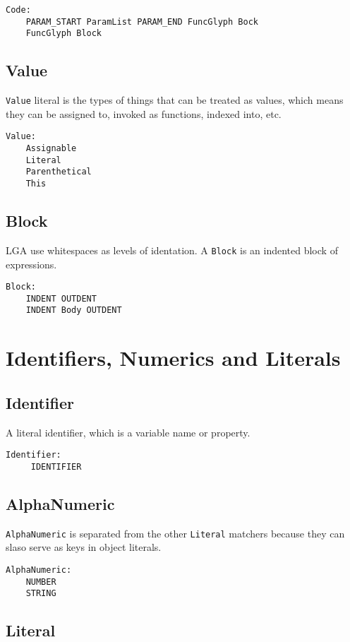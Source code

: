 \documentclass[10pt]{report}
\begin{document}
\begin{verbatim}
Code:
    PARAM_START ParamList PARAM_END FuncGlyph Bock
    FuncGlyph Block
\end{verbatim}

\subsection{Value}
\texttt{Value} literal is the types of things that can be treated as values, which means they can be assigned to, invoked as functions, indexed into, etc.

\begin{verbatim}
Value:
    Assignable
    Literal
    Parenthetical
    This
\end{verbatim}

\subsection{Block}
\label{sec:block}

LGA use whitespaces as levels of identation. A \texttt{Block} is an indented block of expressions.
\begin{verbatim}
Block:
    INDENT OUTDENT
    INDENT Body OUTDENT
\end{verbatim}

\section{Identifiers,  Numerics and Literals}

\subsection{Identifier}
A literal identifier, which is a variable name or property.
\begin{verbatim}
Identifier:
     IDENTIFIER
\end{verbatim}

\subsection{AlphaNumeric}
\texttt{AlphaNumeric} is separated from the other \texttt{Literal} matchers because they can slaso serve as keys in object literals.
\begin{verbatim}
AlphaNumeric:
    NUMBER
    STRING
\end{verbatim}

\subsection{Literal}
\end{document}
